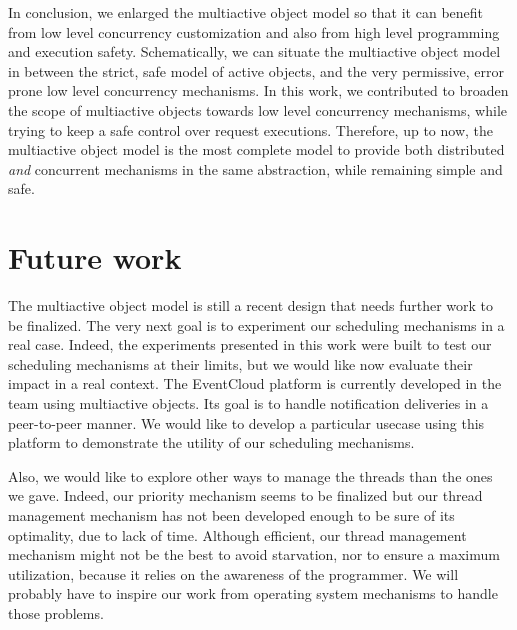 \documentclass[11pt]{report}
\begin{document}
In conclusion, we enlarged the multiactive object model so that it can benefit from low level concurrency customization and also from high level programming and execution safety. Schematically, we can situate the multiactive object model in between the strict, safe model of active objects, and the very permissive, error prone low level concurrency mechanisms. In this work, we contributed to broaden the scope of multiactive objects towards low level concurrency mechanisms, while trying to keep a safe control over request executions. Therefore, up to now, the multiactive object model is the most complete model to provide both distributed \emph{and} concurrent mechanisms in the same abstraction, while remaining simple and safe.



\section{Future work}
The multiactive object model is still a recent design that needs further work to be finalized. The very next goal is to experiment our scheduling mechanisms in a real case. Indeed, the experiments presented in this work were built to test our scheduling mechanisms at their limits, but we would like now evaluate their impact in a real context. The EventCloud platform \cite{ref:eventcloud} is currently developed in the team using multiactive objects. Its goal is to handle notification deliveries in a peer-to-peer manner. We would like to develop a particular usecase using this platform to demonstrate the utility of our scheduling mechanisms. 

Also, we would like to explore other ways to manage the threads than the ones we gave. Indeed, our priority mechanism seems to be finalized but our thread management mechanism has not been developed enough to be sure of its optimality, due to lack of time. Although efficient, our thread management mechanism might not be the best to avoid starvation, nor to ensure a maximum utilization, because it relies on the awareness of the programmer. We will probably have to inspire our work from operating system mechanisms to handle those problems.
\end{document}
